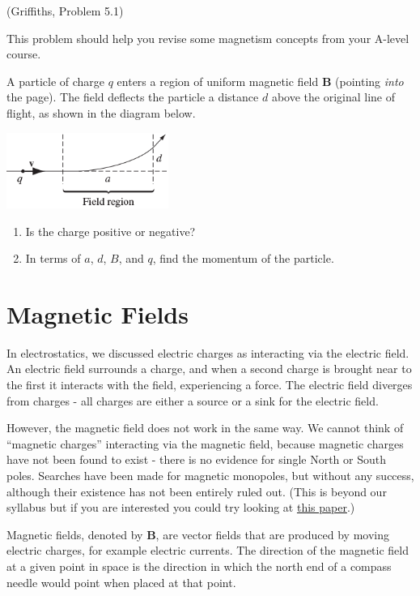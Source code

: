\documentclass[
  letterpaper,
  DIV=11,
  numbers=noendperiod]{scrreprt}
\begin{document}
(Griffiths, Problem 5.1)

This problem should help you revise some magnetism concepts from your
A-level course.

A particle of charge \(q\) enters a region of uniform magnetic field
\(\mathrm{\mathbf{B}}\) (pointing \emph{into} the page). The field
deflects the particle a distance \(d\) above the original line of
flight, as shown in the diagram below.

\includegraphics[width=2.08333in,height=\textheight]{Figures/L4_preprob.png}

\begin{enumerate}
\def\labelenumi{(\alph{enumi})}
\item
  Is the charge positive or negative?
\item
  In terms of \(a\), \(d\), \(B\), and \(q\), find the momentum of the
  particle.
\end{enumerate}

\section{Magnetic Fields}\label{magnetic-fields}

In electrostatics, we discussed electric charges as interacting via the
electric field. An electric field surrounds a charge, and when a second
charge is brought near to the first it interacts with the field,
experiencing a force. The electric field diverges from charges - all
charges are either a source or a sink for the electric field.

However, the magnetic field does not work in the same way. We cannot
think of ``magnetic charges'' interacting via the magnetic field,
because magnetic charges have not been found to exist - there is no
evidence for single North or South poles. Searches have been made for
magnetic monopoles, but without any success, although their existence
has not been entirely ruled out. (This is beyond our syllabus but if you
are interested you could try looking at
\href{https://royalsocietypublishing.org/doi/10.1098/rsta.2018.0328}{this
paper}.)

Magnetic fields, denoted by \(\mathrm{\mathbf{B}}\), are vector fields
that are produced by moving electric charges, for example electric
currents. The direction of the magnetic field at a given point in space
is the direction in which the north end of a compass needle would point
when placed at that point.
\end{document}
